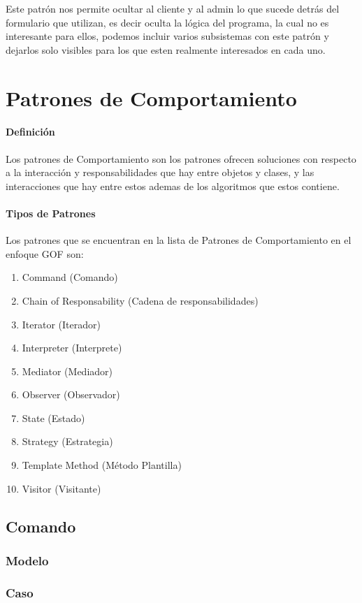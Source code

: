 Este patrón nos permite ocultar al cliente y al admin lo que sucede detrás del formulario que utilizan, es decir oculta la lógica del programa, la cual no es interesante para ellos, podemos incluir varios subsistemas con este patrón y dejarlos solo visibles para los que esten realmente interesados en cada uno. 
\newpage

\section{Patrones de Comportamiento}
\paragraph{Definición}
Los patrones de Comportamiento son los patrones ofrecen soluciones con respecto a la interacción y responsabilidades que hay entre objetos y clases, y las interacciones que hay entre estos ademas de los algoritmos que estos contiene.
\paragraph{Tipos de Patrones}
Los patrones que se encuentran en la lista de Patrones de Comportamiento en el enfoque GOF son:
\begin{enumerate}
	\item Command (Comando)
	\item Chain of Responsability (Cadena de responsabilidades)
	\item Iterator (Iterador)
	\item Interpreter (Interprete)
	\item Mediator (Mediador)
	\item Observer (Observador)
	\item State (Estado)
	\item Strategy (Estrategia)
	\item Template Method (Método Plantilla)
	\item Visitor (Visitante)
\end{enumerate}

\subsection{Comando}
\subsubsection{Modelo}
\newpage
\subsubsection{Caso}
\newpage

